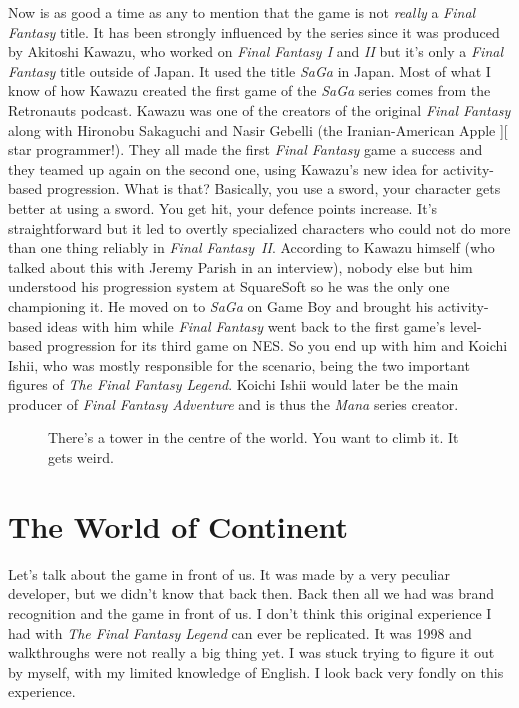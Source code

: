 \documentclass{book}
\begin{document}
Now is as good a time as any to mention that the game is not \emph{really} a \emph{Final Fantasy} title. It has been strongly influenced by the series since it was produced by Akitoshi Kawazu, who worked on \emph{Final Fantasy I} and \emph{II} but it’s only a \emph{Final Fantasy} title outside of Japan. It used the title \emph{SaGa} in Japan. Most of what I know of how Kawazu created the first game of the \emph{SaGa} series comes from the Retronauts podcast. Kawazu was one of the creators of the original \emph{Final Fantasy} along with Hironobu Sakaguchi and Nasir Gebelli (the Iranian-American Apple ][ star programmer!). They all made the first \emph{Final Fantasy} game a success and they teamed up again on the second one, using Kawazu’s new idea for activity-based progression. What is that? Basically, you use a sword, your character gets better at using a sword. You get hit, your defence points increase. It’s straightforward but it led to overtly specialized characters who could not do more than one thing reliably in \emph{Final Fantasy~II}. According to Kawazu himself (who talked about this with Jeremy Parish in an interview), nobody else but him understood his progression system at SquareSoft so he was the only one championing it. He moved on to \emph{SaGa} on Game Boy and brought his activity-based ideas with him while \emph{Final Fantasy} went back to the first game’s level-based progression for its third game on NES. So you end up with him and Koichi Ishii, who was mostly responsible for the scenario, being the two important figures of \emph{The Final Fantasy Legend}. Koichi Ishii would later be the main producer of \emph{Final Fantasy Adventure} and is thus the \emph{Mana} series creator.\par
\FloatBarrier\vspace{\baselineskip}\begin{figure}[H]\caption*{There’s a tower in the centre of the world. You want to climb it. It gets weird.}\end{figure}
\FloatBarrier\section*{The World of Continent}
Let’s talk about the game in front of us. It was made by a very peculiar developer, but we didn’t know that back then. Back then all we had was brand recognition and the game in front of us. I don’t think this original experience I had with \emph{The Final Fantasy Legend} can ever be replicated. It was 1998 and walkthroughs were not really a big thing yet. I was stuck trying to figure it out by myself, with my limited knowledge of English. I look back very fondly on this experience.\par
\end{document}
